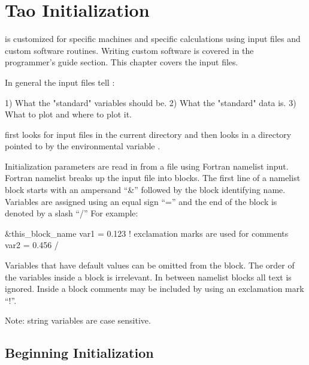 \chapter{Tao Initialization}
\label{c:init}

\tao is customized for specific machines and specific calculations
using input files and custom software routines. Writing custom software is
covered in the programmer's guide section. This chapter covers the
input files. 

In general the input files tell \tao:
\begin{example}
  1) What the "standard" variables should be.
  2) What the "standard" data is.
  3) What to plot and where to plot it.
\end{example}

\tao first looks for input files in the current directory and then
looks in a directory pointed to by the environmental variable
.

Initialization parameters are read in from a file using Fortran
namelist input. Fortran namelist breaks up the input file into
blocks. The first line of a namelist block starts with an ampersand ``\&''
followed by the block identifying name. Variables are assigned using
an equal sign ``='' and the end of the block is denoted by a slash ``/''
For example:
\begin{example}
  \&this_block_name
    var1 = 0.123   ! exclamation marks are used for comments
    var2 = 0.456
  /
\end{example}
Variables that have default values can be omitted from the block.  The
order of the variables inside a block is irrelevant.  In between
namelist blocks all text is ignored. Inside a block comments may be
included by using an exclamation mark ``!''.

Note: string variables are case sensitive.

\section{Beginning Initialization}
\label{s:init_global} 

